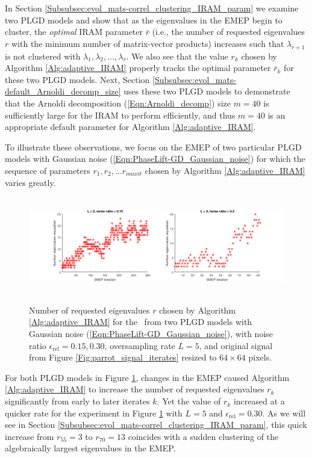 In Section \ref{Subsubsec:evol_mats-correl_clustering_IRAM_param} we examine two PLGD models and show that as the eigenvalues in the EMEP begin to cluster, the \textit{optimal} IRAM parameter $\bar{r}$ (i.e., the number of requested eigenvalues $r$ with the minimum number of matrix-vector products) increases such that $\lambda_{\bar{r}+1}$ is not clustered with $\lambda_1, \lambda_2, \ldots, \lambda_{\bar{r}}$.
We also see that the value $r_k$ chosen by Algorithm \ref{Alg:adaptive_IRAM} properly tracks the optimal parameter $\bar{r}_k$ for these two PLGD models.
Next, Section \ref{Subsubsec:evol_mats-default_Arnoldi_decomp_size} uses these two PLGD models to demonstrate that the Arnoldi decomposition (\ref{Eqn:Arnoldi_decomp}) size $m=40$ is sufficiently large for the IRAM to perform efficiently, and thus $m=40$ is an appropriate default parameter for Algorithm \ref{Alg:adaptive_IRAM}.





To illustrate these observations, we focus on the EMEP of two particular PLGD models with Gaussian noise (\ref{Eqn:PhaseLift-GD_Gaussian_noise}) for which the sequence of parameters $r_1, r_2, \ldots r_{maxit}$ chosen by Algorithm \ref{Alg:adaptive_IRAM} varies greatly.

\begin{figure}[H]
\centering
\hbox{\hspace{-1.8cm} \includegraphics[scale=0.6]{Numerics-num_eigs_req_ada_2_exps} }\vspace{0.0cm}
	\caption{
Number of requested eigenvalues $r$ chosen by Algorithm \ref{Alg:adaptive_IRAM} for the \emep \ from two PLGD models with Gaussian noise (\ref{Eqn:PhaseLift-GD_Gaussian_noise}), with noise ratio $\epsilon_\text{rel}=0.15, 0.30$, oversampling rate $L=5$, and original signal from Figure \ref{Fig:parrot_signal_iterates} resized to $64 \times 64$ pixels.
}
\label{Fig:Numerics-num_req_eigs_2_exps}
\end{figure}



For both PLGD models in Figure \ref{Fig:Numerics-num_req_eigs_2_exps}, changes in the EMEP caused Algorithm \ref{Alg:adaptive_IRAM} to increase the number of requested eigenvalues $r_k$ significantly from early to later iterates $k$.
Yet the value of $r_k$ increased at a quicker rate for the experiment in Figure \ref{Fig:Numerics-num_req_eigs_2_exps} with $L=5$ and $\epsilon_\text{rel} = 0.30$.
As we will see in Section \ref{Subsubsec:evol_mats-correl_clustering_IRAM_param}, this quick increase from $r_{55}=3$ to $r_{70}=13$ coincides with a sudden clustering of the algebraically largest eigenvalues in the EMEP.





